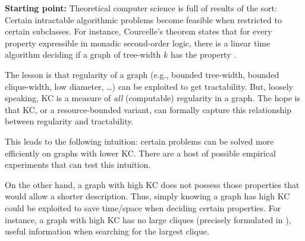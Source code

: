 \documentclass{article}
\theoremstyle{plain} \numberwithin{equation}{section}
\theoremstyle{definition}
\begin{document}
\bigskip

\noindent
{\bf Starting point:}
Theoretical computer science is full of results of the sort: Certain intractable algorithmic problems become feasible when restricted to certain subclasses.
For instance, Courcelle's theorem states that for every property expressible in monadic second-order logic, there is a linear time algorithm deciding if a graph of tree-width $k$ has the property \cite{cour89}.

The lesson is that regularity of a graph
(e.g., bounded tree-width, bounded clique-width, low diameter, \ldots) can be exploited to get tractability. But, loosely speaking, KC is a measure of {\it all} (computable) regularity in a graph. The hope is that KC, or a resource-bounded variant, can formally capture this relationship between regularity and tractability.

\smallskip

This leads to the following intuition: certain problems can be solved more efficiently on graphs with lower KC. There are a host of possible empirical experiments that can test this intuition.


On the other hand, a graph with high KC does not possess those properties that would allow a shorter description. Thus, simply knowing a graph has high KC could be exploited to save time/space when deciding certain properties.  For instance, a graph with high KC has no large cliques (precisely formulated in \cite{BLTV00}), useful information when searching for the largest clique.
\end{document}
